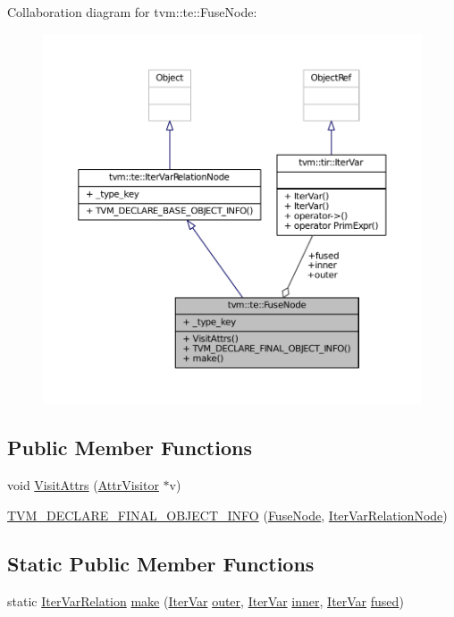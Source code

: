 Collaboration diagram for tvm\+:\+:te\+:\+:Fuse\+Node\+:
\nopagebreak
\begin{figure}[H]
\begin{center}
\leavevmode
\includegraphics[width=350pt]{classtvm_1_1te_1_1FuseNode__coll__graph}
\end{center}
\end{figure}
\subsection*{Public Member Functions}
\begin{DoxyCompactItemize}
\item 
void \hyperlink{classtvm_1_1te_1_1FuseNode_a61330fd9eca1277948bd9900c3f91f08}{Visit\+Attrs} (\hyperlink{classtvm_1_1AttrVisitor}{Attr\+Visitor} $\ast$v)
\item 
\hyperlink{classtvm_1_1te_1_1FuseNode_ad5447bffbfd6ae596bfef3b1234eff1d}{T\+V\+M\+\_\+\+D\+E\+C\+L\+A\+R\+E\+\_\+\+F\+I\+N\+A\+L\+\_\+\+O\+B\+J\+E\+C\+T\+\_\+\+I\+N\+FO} (\hyperlink{classtvm_1_1te_1_1FuseNode}{Fuse\+Node}, \hyperlink{classtvm_1_1te_1_1IterVarRelationNode}{Iter\+Var\+Relation\+Node})
\end{DoxyCompactItemize}
\subsection*{Static Public Member Functions}
\begin{DoxyCompactItemize}
\item 
static \hyperlink{classtvm_1_1te_1_1IterVarRelation}{Iter\+Var\+Relation} \hyperlink{classtvm_1_1te_1_1FuseNode_ae86a4641dfa5d446f078b62a4b213ef3}{make} (\hyperlink{classtvm_1_1tir_1_1IterVar}{Iter\+Var} \hyperlink{classtvm_1_1te_1_1FuseNode_a90efca7f5397eb34989f5d085ae9bab5}{outer}, \hyperlink{classtvm_1_1tir_1_1IterVar}{Iter\+Var} \hyperlink{classtvm_1_1te_1_1FuseNode_a5a867854c20179cd32b19fb1eab90616}{inner}, \hyperlink{classtvm_1_1tir_1_1IterVar}{Iter\+Var} \hyperlink{classtvm_1_1te_1_1FuseNode_ad5abaac8d77c9c88ec374ae91d68cb88}{fused})
\end{DoxyCompactItemize}
